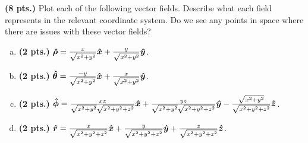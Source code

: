 \documentclass[12pt]{article} %
\newcommand{\rhat}{\boldsymbol{\hat{r}}}
\newcommand{\thetahat}{\boldsymbol{\hat{\theta}}}
\newcommand{\phihat}{\boldsymbol{\hat{\phi}}}
\newcommand{\rhohat}{\boldsymbol{\hat{\rho}}}
\begin{document}
\vspace*{0.5cm}

\begin{problem}
	\textbf{(8 pts.)} Plot each of the following vector fields. Describe what each field represents in the relevant coordinate system. Do we see any points in space where there are issues with these vector fields?
	\begin{enumerate}[(a)]
		\item \textbf{(2 pts.)} $\rhohat = \frac{x}{\sqrt{x^2+y^2}}\xhat + \frac{y}{\sqrt{x^2+y^2}}\yhat$.
		\item \textbf{(2 pts.)} $\thetahat = \frac{-y}{\sqrt{x^2+y^2}}\xhat + \frac{x}{\sqrt{x^2+y^2}}\yhat$.
		\item \textbf{(2 pts.)} $\phihat = \frac{xz}{\sqrt{x^2+y^2}\sqrt{x^2+y^2+z^2}}\xhat + \frac{yz}{\sqrt{x^2+y^2}\sqrt{x^2+y^2+z^2}}\yhat-\frac{\sqrt{x^2+y^2}}{\sqrt{x^2+y^2+z^2}}\zhat$.
		\item \textbf{(2 pts.)} $\rhat = \frac{x}{\sqrt{x^2+y^2+z^2}}\xhat + \frac{y}{\sqrt{x^2+y^2+z^2}}\yhat+\frac{z}{\sqrt{x^2+y^2+z^2}}\zhat$.
	\end{enumerate}
\end{problem}

\vspace*{.5cm}
\end{document}
